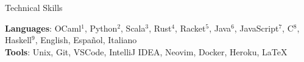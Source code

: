 
\begin{rSection}{Technical Skills}

	\textbf{Languages}: OCaml$^{1}$, Python$^{2}$, Scala$^{3}$, Rust$^{4}$, Racket$^{5}$, Java$^{6}$, JavaScript$^{7}$, C$^{8}$, Haskell$^{9}$, English, Espa{\~n}ol, Italiano
	\\
	\textbf{Tools}: Unix, Git, VSCode, IntelliJ IDEA, Neovim, Docker, Heroku, \LaTeX
\end{rSection}